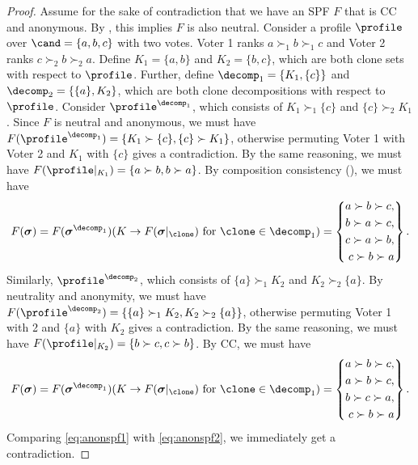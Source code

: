 \begin{proof}
    Assume for the sake of contradiction that we have an SPF $F$ that is CC and anonymous. By , this implies $F$ is also neutral. Consider a profile $\profile$ over $\cand=\{a,b,c\}$ with two votes. Voter 1 ranks $a \succ_1 b \succ_1 c$ and Voter 2 ranks $c \succ_2 b \succ_2 a$. Define $K_1=\{a,b\}$ and $K_2=\{b,c\}$, which are both clone sets with respect to $\profile$. Further, define $\decomp_1=\{K_1,\{c\}\}$ and $\decomp_2=\{
    \{a\},K_2\}$, which are both clone decompositions with respect to $\profile$. Consider $\profile^{\decomp_1}$, which consists of $K_1 \succ_1 \{c\}$ and $\{c\} \succ_2 K_1$. Since $F$ is neutral and anonymous, we must have  $F(\profile^{\decomp_1})=\{K_1\succ \{c\}, \{c\} \succ K_1\}$, otherwise permuting Voter 1 with Voter 2 and $K_1$ with $\{c\}$ gives a contradiction. By the same reasoning, we must have $F(\profile|_{K_1})=\{a\succ b, b\succ a\}$. By composition consistency (), we must have
    \begin{align}
        F(\boldsymbol{\sigma}) = F(\boldsymbol{\sigma}^{\decomp_1})(K \rightarrow F(\boldsymbol{\sigma}|_\clone)\text{ for }\clone \in \decomp_1)=\left\{\!\begin{aligned}a\succ b \succ c,\\ b\succ a \succ c, \\c\succ a \succ b, \\c\succ b \succ a\end{aligned}\right\}.\label{eq:anonspf1}
    \end{align}
    Similarly, $\profile^{\decomp_2}$, which consists of $\{a\} \succ_1 K_2$ and $K_2 \succ_2 \{a\}$. By neutrality and anonymity, we must have  $F(\profile^{\decomp_2})=\{\{a\} \succ_1 K_2, K_2 \succ_2 \{a\}\}$, otherwise permuting Voter 1 with 2 and $\{a\}$ with $K_2$ gives a contradiction. By the same reasoning, we must have $F(\profile|_{K_2})=\{b\succ c, c\succ b\}$. By CC, we must have
    \begin{align}
        F(\boldsymbol{\sigma}) = F(\boldsymbol{\sigma}^{\decomp_1})(K \rightarrow F(\boldsymbol{\sigma}|_\clone)\text{ for }\clone \in \decomp_1)=\left\{\!\begin{aligned}a\succ b \succ c,\\ a\succ b \succ c, \\b\succ c \succ a, \\c\succ b \succ a\end{aligned}\right\}.\label{eq:anonspf2}
    \end{align}
    Comparing \eqref{eq:anonspf1} with \eqref{eq:anonspf2}, we immediately get a contradiction.
\end{proof}

